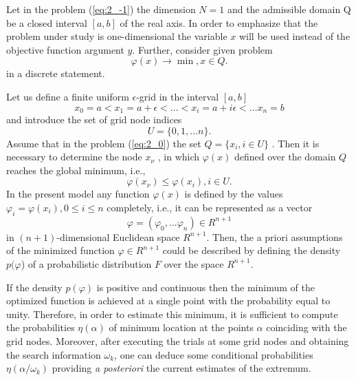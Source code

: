 Let in the problem (\ref{eq:2_-1})  the dimension $N=1$ and the admissible domain Q be a closed interval $[a,b]$ of the real axis. In order to emphasize that the problem under study is  one-dimensional  the variable $x$ will be used instead of the objective function argument $y$. Further, consider given problem 
\begin{equation}
\label{eq:2_0}
\varphi(x)\rightarrow\min, x \in Q.
\end{equation}
in a discrete statement.

Let us define a finite uniform $\epsilon$-grid in the interval $[a,b]$ 
\begin{equation}
\label{eq:2_1}
x_0=a<x_1=a+\epsilon<\ldots<x_i=a+i\epsilon<\ldots x_n=b
\end{equation}
and introduce the set of grid node indices 
\begin{equation}
\label{eq:2_2}
U=\{0,1,\ldots n\}.
\end{equation}
Assume that in the problem (\ref{eq:2_0}) the set $Q=\{x_i,i\in U\}$ . Then it is necessary to determine the node $x_\nu$ , in which $\varphi(x)$ defined over the domain $Q$ reaches the global minimum, i.e.,
\begin{equation}
\label{eq:2_3}
\varphi(x_\nu)\leq \varphi(x_i),i\in U.
\end{equation}
In the present model any function $\varphi(x)$  is defined by the values $\varphi_i=\varphi(x_i),0\leq i\leq n$  completely, i.e., it can be represented as a vector
\begin{equation}
\label{eq:2_4}
\varphi=(\varphi_0,\ldots \varphi_n)\in R^{n+1}
\end{equation}
in $(n+1)$-dimensional Euclidean space $R^{n+1}$. Then, the a priori assumptions of the minimized function  $\varphi\in R^{n+1}$ could be described by defining the density $p(\varphi$) of a probabilistic distribution $F$ over the space $R^{n+1}$.

If the density $p(\varphi)$ is  positive and continuous then the minimum of the optimized function is achieved at a single point with the probability equal to unity. Therefore, in order to estimate this minimum, it is sufficient  to compute the probabilities $\eta(\alpha)$ of minimum location at the points $\alpha$ coinciding with the grid nodes. Moreover, after executing the trials at some grid nodes and obtaining the search information $\omega_k$, one can deduce some conditional probabilities $\eta(\alpha/\omega_k)$  providing \textit{a posteriori} the current estimates of the extremum. 


